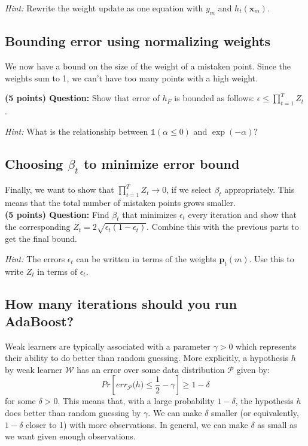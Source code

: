 \documentclass{article}
\begin{document}
\noindent \textit{Hint:} Rewrite the weight update as one equation with $y_m$ and $h_t(\mathbf{x}_m)$.

\subsection{Bounding error using normalizing weights}

We now have a bound on the size of the weight of a mistaken point.
Since the weights sum to 1, we can't have too many points with a high weight.

\noindent \textbf{(5 points) Question:} Show that error of $h_F$ is bounded as follows: $\epsilon \leq \prod\limits_{t=1}^T Z_t$.

\noindent \textit{Hint:} What is the relationship between $\mathds{1}(\alpha \leq 0)$ and $\exp(-\alpha)$?

\subsection{Choosing $\beta_t$ to minimize error bound}
Finally, we want to show that $\prod_{t=1}^T Z_t \rightarrow 0$, if we select $\beta_t$ appropriately.
This means that the total number of mistaken points grows smaller.\\

\noindent \textbf{(5 points) Question:} Find $\beta_t$ that minimizes $\epsilon_t$ every iteration and show that the corresponding $Z_t = 2 \sqrt{\epsilon_t(1-\epsilon_t)}$. Combine this with the previous parts to get the final bound.

\noindent \textit{Hint:} The errors $\epsilon_t$ can be written in terms of the weights $\mathbf{p}_t(m)$. Use this to write $Z_t$ in terms of $\epsilon_t$.

\subsection{How many iterations should you run AdaBoost?}

Weak learners are typically associated with a parameter $\gamma > 0$ which represents their ability to do better than random guessing. More explicitly, a hypothesis $h$ by weak learner $\mathcal{W}$ has an error over some data distribution $\mathcal{P}$ given by:
$$Pr\left[err_\mathcal{P}\mathcal(h) \leq \dfrac{1}{2} - \gamma\right] \geq 1-\delta$$
for some $\delta > 0$. This means that, with a large probability $1-\delta$, the hypothesis $h$ does better than random guessing by $\gamma$.
We can make $\delta$ smaller (or equivalently, $1-\delta$ closer to 1) with more observations.
In general, we can make $\delta$ as small as we want given enough observations. 
\end{document}
